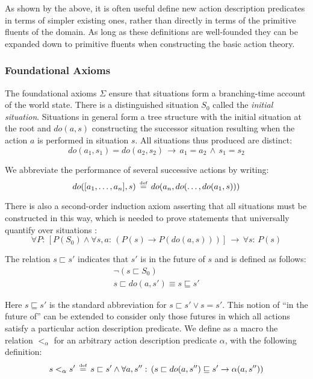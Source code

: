 As shown by the above, it is often useful define new action description
predicates in terms of simpler existing ones, rather than directly
in terms of the primitive fluents of the domain. As long as these
definitions are well-founded they can be expanded down to primitive
fluents when constructing the basic action theory.


\subsubsection{Foundational Axioms}

The foundational axioms $\Sigma$ ensure that situations form a branching-time
account of the world state. There is a distinguished situation $S_{0}$
called the \emph{initial situation}. Situations in general form a
tree structure with the initial situation at the root and $do(a,s)$
constructing the successor situation resulting when the action $a$
is performed in situation $s$. All situations thus produced are distinct:\[
do(a_{1},s_{1})=do(a_{2},s_{2})\,\rightarrow\, a_{1}=a_{2}\,\wedge\, s_{1}=s_{2}\]


We abbreviate the performance of several successive actions by writing:\[
do([a_{1},\dots,a_{n}],s)\,\stackrel{\mbox{\tiny def}}{=}\, do(a_{n},do(\dots,do(a_{1},s)))\]


There is also a second-order induction axiom asserting that all situations
must be constructed in this way, which is needed to prove statements
that universally quantify over situations \citep{Reiter93proving}:\[
\forall P:\,\left[P(S_{0})\wedge\forall s,a:\,\left(P(s)\rightarrow P(do(a,s))\right)\right]\,\rightarrow\,\forall s:\, P(s)\]


The relation $s\sqsubset s'$ indicates that $s'$ is in the future
of $s$ and is defined as follows:\begin{gather*}
\neg(s\sqsubset S_{0})\\
s\sqsubset do(a,s')\equiv s\sqsubseteq s'\end{gather*}


Here $s\sqsubseteq s'$ is the standard abbreviation for $s\sqsubset s'\vee s=s'$.
This notion of {}``in the future of'' can be extended to consider
only those futures in which all actions satisfy a particular action
description predicate. We define as a macro the relation $<_{\alpha}$
for an arbitrary action description predicate $\alpha$, with the
following definition:\[
s<_{\alpha}s'\,\stackrel{\mbox{\tiny def}}{=}\, s\sqsubset s'\wedge\forall a,s'':\,\left(s\sqsubset do(a,s'')\sqsubseteq s'\rightarrow\alpha(a,s'')\right)\]


